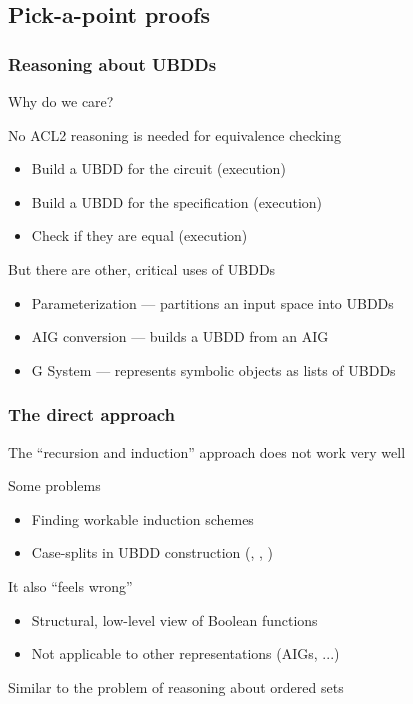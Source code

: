 
\subsection{Pick-a-point proofs}
\begin{frame}
\frametitle{Reasoning about UBDDs}

Why do we care?

\SmallSkip
No ACL2 reasoning is needed for equivalence checking
\begin{itemize} 
\item Build a UBDD for the circuit (execution)
\item Build a UBDD for the specification (execution)
\item Check if they are equal (execution)
\end{itemize}

\SmallSkip

But there are other, critical uses of UBDDs
\begin{itemize}
\item Parameterization --- partitions an input space into UBDDs
\item AIG conversion --- builds a UBDD from an AIG
\item G System --- represents symbolic objects as lists of UBDDs
\end{itemize}

\end{frame}




\begin{frame}[fragile]
\frametitle{The direct approach}

The ``recursion and induction'' approach does not work very well

\SmallSkip
Some problems
\begin{itemize}
\item Finding workable induction schemes
\item Case-splits in UBDD construction (, , )
\end{itemize}

\SmallSkip
It also ``feels wrong''
\begin{itemize}
\item Structural, low-level view of Boolean functions
\item Not applicable to other representations (AIGs, ...)
\end{itemize}

\SmallSkip
Similar to the problem of reasoning about ordered sets

\end{frame}


